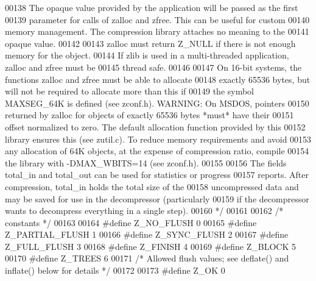 \begin{DoxyCode}
00138 \textcolor{comment}{     The opaque value provided by the application will be passed as the first}
00139 \textcolor{comment}{   parameter for calls of zalloc and zfree.  This can be useful for custom}
00140 \textcolor{comment}{   memory management.  The compression library attaches no meaning to the}
00141 \textcolor{comment}{   opaque value.}
00142 \textcolor{comment}{}
00143 \textcolor{comment}{     zalloc must return Z\_NULL if there is not enough memory for the object.}
00144 \textcolor{comment}{   If zlib is used in a multi-threaded application, zalloc and zfree must be}
00145 \textcolor{comment}{   thread safe.}
00146 \textcolor{comment}{}
00147 \textcolor{comment}{     On 16-bit systems, the functions zalloc and zfree must be able to allocate}
00148 \textcolor{comment}{   exactly 65536 bytes, but will not be required to allocate more than this if}
00149 \textcolor{comment}{   the symbol MAXSEG\_64K is defined (see zconf.h).  WARNING: On MSDOS, pointers}
00150 \textcolor{comment}{   returned by zalloc for objects of exactly 65536 bytes *must* have their}
00151 \textcolor{comment}{   offset normalized to zero.  The default allocation function provided by this}
00152 \textcolor{comment}{   library ensures this (see zutil.c).  To reduce memory requirements and avoid}
00153 \textcolor{comment}{   any allocation of 64K objects, at the expense of compression ratio, compile}
00154 \textcolor{comment}{   the library with -DMAX\_WBITS=14 (see zconf.h).}
00155 \textcolor{comment}{}
00156 \textcolor{comment}{     The fields total\_in and total\_out can be used for statistics or progress}
00157 \textcolor{comment}{   reports.  After compression, total\_in holds the total size of the}
00158 \textcolor{comment}{   uncompressed data and may be saved for use in the decompressor (particularly}
00159 \textcolor{comment}{   if the decompressor wants to decompress everything in a single step).}
00160 \textcolor{comment}{*/}
00161 
00162                         \textcolor{comment}{/* constants */}
00163 
00164 \textcolor{preprocessor}{#define Z\_NO\_FLUSH      0}
00165 \textcolor{preprocessor}{#define Z\_PARTIAL\_FLUSH 1}
00166 \textcolor{preprocessor}{#define Z\_SYNC\_FLUSH    2}
00167 \textcolor{preprocessor}{#define Z\_FULL\_FLUSH    3}
00168 \textcolor{preprocessor}{#define Z\_FINISH        4}
00169 \textcolor{preprocessor}{#define Z\_BLOCK         5}
00170 \textcolor{preprocessor}{#define Z\_TREES         6}
00171 \textcolor{comment}{/* Allowed flush values; see deflate() and inflate() below for details */}
00172 
00173 \textcolor{preprocessor}{#define Z\_OK            0}

\end{DoxyCode}

